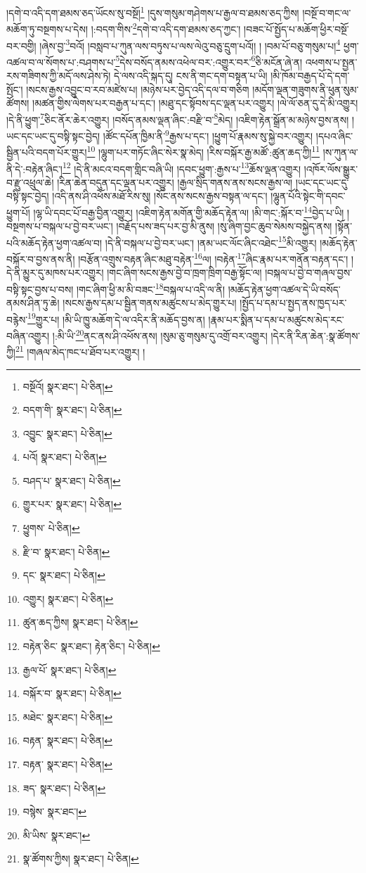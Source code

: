།དགེ་བ་འདི་དག་ཐམས་ཅད་ཡོངས་སུ་བསྔོ།\footnote{བསྔོའོ།  སྣར་ཐང་།  པེ་ཅིན། } །དུས་གསུམ་གཤེགས་པ་རྒྱལ་བ་ཐམས་ཅད་ཀྱིས། །བསྔོ་བ་གང་ལ་མཆོག་ཏུ་བསྔགས་པ་དེས། །:བདག་གིས་\footnote{བདག་གི་  སྣར་ཐང་།  པེ་ཅིན། }དགེ་བ་འདི་དག་ཐམས་ཅད་ཀྱང་། །བཟང་པོ་སྤྱོད་པ་མཆོག་ཕྱིར་བསྔོ་བར་བགྱི། །ཞེས་བྱ་\footnote{འབྱུང་  སྣར་ཐང་།  པེ་ཅིན། }བའོ། །བསླབ་པ་ཀུན་ལས་བཏུས་པ་ལས་ལེའུ་བཅུ་དྲུག་པའོ།། །
།བམ་པོ་བཅུ་གསུམ་པ།\footnote{པའོ།  སྣར་ཐང་།  པེ་ཅིན། } ཕྱག་འཚལ་བ་ལ་སོགས་པ་:བཤགས་པ་\footnote{བཤད་པ་  སྣར་ཐང་།  པེ་ཅིན། }དེས་བསོད་ནམས་འཕེལ་བར་:འགྱུར་བར་\footnote{གྱུར་པར་  སྣར་ཐང་།  པེ་ཅིན། }ཅི་མངོན་ཞེ་ན། འཕགས་པ་སྤྱན་རས་གཟིགས་ཀྱི་མདོ་ལས་ཤེས་ཏེ། དེ་ལས་འདི་སྐད་དུ། ངས་ནི་གང་དག་བསྟན་པ་ཡི། །མི་ཁོམ་བརྒྱད་པོ་དེ་དག་སྤོང་། །སངས་རྒྱས་འབྱུང་བ་རབ་མཛེས་པ། །མཉེས་པར་བྱེད་འདི་དལ་བ་གཅིག །མདོག་ལྡན་གཟུགས་ནི་ཕུན་སུམ་ཚོགས། །མཚན་གྱིས་ལེགས་པར་བརྒྱན་པ་དང་། །མཐུ་དང་སྟོབས་དང་ལྡན་པར་འགྱུར། །ལེ་ལོ་ཅན་དུ་དེ་མི་འགྱུར། །དེ་ནི་ཕྱུག་\footnote{ཕྱུགས་  པེ་ཅིན། }ཅིང་ནོར་ཆེར་འགྱུར། །བསོད་ནམས་ལྡན་ཞིང་:བརྫི་བ་\footnote{རྫི་བ་  སྣར་ཐང་།  པེ་ཅིན། }མེད། །འཇིག་རྟེན་སྒྲོན་མ་མཉེས་བྱས་ནས། །ཡང་དང་ཡང་དུ་བསྟི་སྟང་བྱེད། །ཚོང་དཔོན་ཁྱིམ་ནི་\footnote{དང་  སྣར་ཐང་།  པེ་ཅིན། }རྒྱས་པ་དང་། །ཕྱུག་པོ་རྣམས་སུ་སྐྱེ་བར་འགྱུར། །དཔའ་ཞིང་སྦྱིན་པའི་བདག་པོར་གྱུར།\footnote{འགྱུར།  སྣར་ཐང་།  པེ་ཅིན། } །ལྷུག་པར་གཏོང་ཞིང་སེར་སྣ་མེད། །རིས་བསྐོར་རྒྱ་མཚོ་:ཚུན་ཆད་ཀྱི།\footnote{ཚུན་ཆད་ཀྱིས།  སྣར་ཐང་།  པེ་ཅིན། } །ས་ཀུན་ལ་ནི་དེ་:བརྟེན་ཞིང་།\footnote{བརྟེན་ཅིང་  སྣར་ཐང་། རྟེན་ཅིང་།  པེ་ཅིན། } །དེ་ནི་མངའ་བདག་གླིང་བཞི་ཡི། །དབང་ཕྱུག་:རྒྱས་པ་\footnote{རྒྱལ་པོ་  སྣར་ཐང་།  པེ་ཅིན། }ཆོས་ལྡན་འགྱུར། །འཁོར་ལོས་སྒྱུར་བ་རྫུ་འཕྲུལ་ཆེ། །རིན་ཆེན་བདུན་དང་ལྡན་པར་འགྱུར། །རྒྱལ་སྲིད་གནས་ནས་སངས་རྒྱས་ལ། །ཡང་དང་ཡང་དུ་བསྟི་སྟང་བྱེད། །འདི་ནས་ཤི་འཕོས་མཐོ་རིས་སུ། །སོང་ནས་སངས་རྒྱས་བསྟན་ལ་དང་། །ལྷུན་པོའི་སྟེང་གི་དབང་ཕྱུག་པོ། །ལྷ་ཡི་དབང་པོ་བརྒྱ་བྱིན་འགྱུར། །འཇིག་རྟེན་མགོན་གྱི་མཆོད་རྟེན་ལ། །མི་གང་:སྐོར་བ་\footnote{བསྐོར་བ་  སྣར་ཐང་།  པེ་ཅིན། }བྱེད་པ་ཡི། །བསྔགས་པ་བསྐལ་པ་བྱེ་བར་ཡང་། །བརྗོད་པས་ཟད་པར་བྱ་མི་ནུས། །སུ་ཞིག་བྱང་ཆུབ་སེམས་བསྐྱེད་ནས། །སྟོན་པའི་མཆོད་རྟེན་ཕྱག་འཚལ་བ། །དེ་ནི་བསྐལ་པ་བྱེ་བར་ཡང་། །ནམ་ཡང་ལོང་ཞིང་འཐེང་\footnote{མཐེང་  སྣར་ཐང་།  པེ་ཅིན། }མི་འགྱུར། །མཆོད་རྟེན་བསྐོར་བ་བྱས་ནས་ནི། །བརྩོན་འགྲུས་བརྟན་ཞིང་མཐུ་བརྟེན་\footnote{བརྟན་  སྣར་ཐང་།  པེ་ཅིན། }ལ། །བརྟེན་\footnote{བརྟན་  སྣར་ཐང་།  པེ་ཅིན། }ཞིང་རྣམ་པར་གནོན་བརྟན་དང་། །དེ་ནི་མྱུར་དུ་མཁས་པར་འགྱུར། །གང་ཞིག་སངས་རྒྱས་བྱེ་བ་ཁྲག་ཁྲིག་བརྒྱ་སྟོང་ལ། །བསྐལ་པ་བྱེ་བ་གཞལ་བྱས་བསྟི་སྟང་བྱས་པ་བས། །གང་ཞིག་ཕྱི་མ་མི་བཟང་\footnote{ཟད་  སྣར་ཐང་།  པེ་ཅིན། }བསྐལ་པ་འདི་ལ་ནི། །མཆོད་རྟེན་ཕྱག་འཚལ་དེ་ཡི་བསོད་ནམས་ཤིན་ཏུ་ཆེ། །སངས་རྒྱས་དམ་པ་སྦྱིན་གནས་མཚུངས་པ་མེད་གྱུར་པ། །སྤྱོད་པ་དམ་པ་སྤྱད་ནས་ཁྱད་པར་བརྙེས་\footnote{བསྙེས་  སྣར་ཐང་། }གྱུར་པ། །མི་ཡི་ཁྱུ་མཆོག་དེ་ལ་འདིར་ནི་མཆོད་བྱས་ན། །རྣམ་པར་སྨིན་པ་དམ་པ་མཚུངས་མེད་རང་བཞིན་འགྱུར། །:མི་ཡི་\footnote{མི་ཡིས་  སྣར་ཐང་། }ནང་ནས་ཤི་འཕོས་ནས། །སུམ་ཅུ་གསུམ་དུ་འགྲོ་བར་འགྱུར། །དེར་ནི་རིན་ཆེན་:སྣ་ཚོགས་ཀྱི།\footnote{སྣ་ཚོགས་ཀྱིས།  སྣར་ཐང་།  པེ་ཅིན། } །གཞལ་མེད་ཁང་པ་ཐོབ་པར་འགྱུར། །
